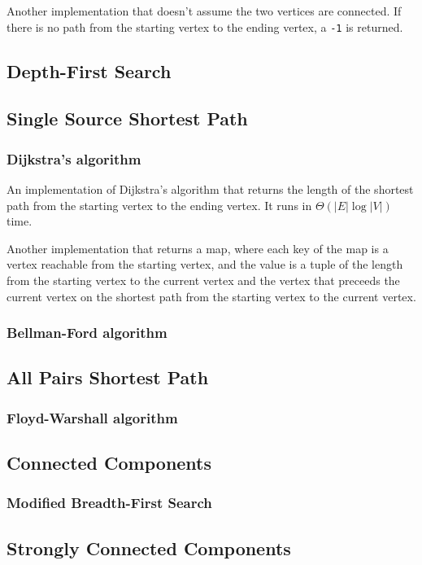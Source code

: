 \documentclass[11pt,a4paper,titlepage]{article}
\begin{document}
			Another implementation that doesn't assume the two vertices are connected. If there is no path from the starting vertex to the ending vertex, a \lstinline$-1$ is returned.
			

		\subsection{Depth-First Search}
		\subsection{Single Source Shortest Path}
			\subsubsection{Dijkstra's algorithm}
				An implementation of Dijkstra's algorithm that returns the length of the shortest path from the starting vertex to the ending vertex. It runs in $\Theta(|E|\log{|V|})$ time.
				

				Another implementation that returns a map, where each key of the map is a vertex reachable from the starting vertex, and the value is a tuple of the length from the starting vertex to the current vertex and the vertex that preceeds the current vertex on the shortest path from the starting vertex to the current vertex.
				
			\subsubsection{Bellman-Ford algorithm}
		\subsection{All Pairs Shortest Path}
			\subsubsection{Floyd-Warshall algorithm}
		\subsection{Connected Components}
			\subsubsection{Modified Breadth-First Search}
		\subsection{Strongly Connected Components}
\end{document}
